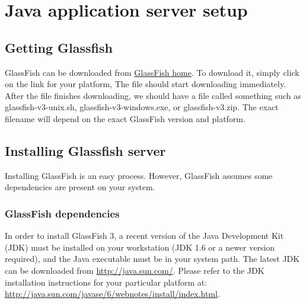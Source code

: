 
\section{Java application server setup}
\subsection{Getting Glassfish}
GlassFish can be downloaded from \href{http://glassfish.dev.java.net}{GlassFish
home}. To download it, simply click on the link for your platform, The file should start downloading immediately. After the file finishes downloading, we should have a file
called something such as glassfish-v3-unix.sh, glassfish-v3-windows.exe, or glassfish-v3.zip.
The exact filename will depend on the exact GlassFish version and platform.

\subsection{Installing Glassfish server}
Installing GlassFish is an easy process. However, GlassFish assumes some dependencies are present on your system.

\subsubsection{GlassFish dependencies}
In order to install GlassFish 3, a recent version of the Java Development Kit (JDK) must be installed on your workstation (JDK 1.6 or a newer version required), and the Java executable must be in your system path. The latest JDK can be downloaded from \url{http://java.sun.com/}. Please refer to the JDK installation instructions for your particular platform at:
\\
\url{http://java.sun.com/javase/6/webnotes/install/index.html}.

